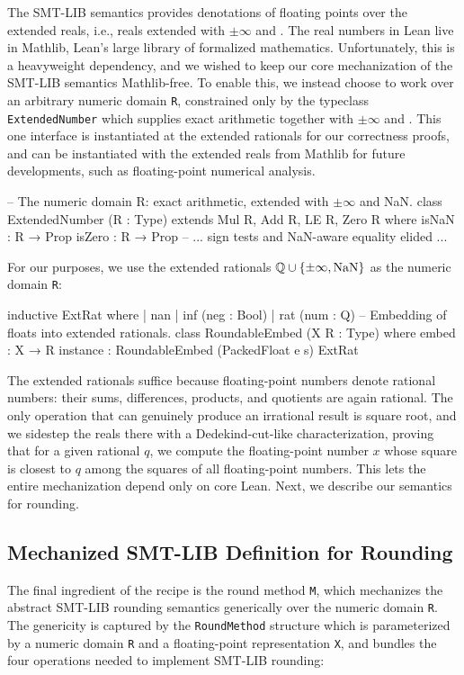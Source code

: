 The SMT-LIB semantics provides denotations of floating points over the extended reals,
i.e., reals extended with $\pm\infty$ and \nan{}.
The real numbers in Lean live in Mathlib, Lean's large library of formalized mathematics.
Unfortunately, this is a heavyweight dependency, and we wished to keep our core mechanization of the SMT-LIB semantics Mathlib-free.
To enable this, we instead choose to work over an arbitrary numeric domain \texttt{R},
constrained only by the typeclass \texttt{ExtendedNumber}
which supplies exact arithmetic together with $\pm\infty$ and \nan{}.
This one interface is instantiated at the extended rationals for our correctness proofs,
and can be instantiated with the extended reals from Mathlib for future developments, such as floating-point numerical analysis.

\begin{lean4}[fontsize=\small]
-- The numeric domain R: exact arithmetic, extended with $\pm\infty$ and NaN.
class ExtendedNumber (R : Type) extends Mul R, Add R, LE R, Zero R where
  isNaN  : R → Prop
  isZero : R → Prop
  -- ... sign tests and NaN-aware equality elided ...
\end{lean4}
\noindent For our purposes, we use the extended rationals $\mathbb{Q} \cup \{\pm\infty, \mathrm{NaN}\}$ as the numeric domain \texttt{R}:
\begin{lean4}[fontsize=\small]
inductive ExtRat where | nan | inf (neg : Bool) | rat (num : Q)
-- Embedding of floats into extended rationals.
class RoundableEmbed (X R : Type) where embed : X → R
instance : RoundableEmbed (PackedFloat e s) ExtRat
\end{lean4}
\noindent The extended rationals suffice because floating-point numbers denote rational numbers:
their sums, differences, products, and quotients are again rational.
The only operation that can genuinely produce an irrational result is square root,
and we sidestep the reals there with a Dedekind-cut-like characterization,
proving that for a given rational $q$, we compute the floating-point number $x$
whose square is closest to $q$ among the squares of all floating-point numbers.
This lets the entire mechanization depend only on core Lean.
Next, we describe our semantics for rounding.

\subsection{Mechanized SMT-LIB Definition for Rounding}\label{sec:fp:adjunction}

The final ingredient of the recipe is the round method \texttt{M},
which mechanizes the abstract SMT-LIB rounding semantics generically over the numeric domain \texttt{R}.
The genericity is captured by the \texttt{RoundMethod} structure
which is parameterized by a numeric domain \texttt{R} and a floating-point representation \texttt{X},
and bundles the four operations needed to implement SMT-LIB rounding:

